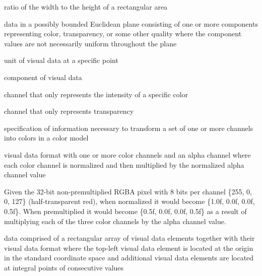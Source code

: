 %
ratio of the width to the height of a rectangular area

%
%
data in a possibly bounded Euclidean plane consisting of one or more components representing color, transparency, or some other quality where the component values are not necessarily uniform throughout the plane

%
unit of visual data at a specific point

%
component of visual data

%
channel that only represents the intensity of a specific color

%
channel that only represents transparency

%
specification of information necessary to transform a set of one or more channels into colors in a color model

%
visual data format with one or more color channels and an alpha channel where each color channel is normalized and then multiplied by the normalized alpha channel value
\begin{example}
Given the 32-bit non-premultiplied RGBA pixel with 8 bits per channel \{255, 0, 0, 127\} (half-transparent red), when normalized it would become \{1.0f, 0.0f, 0.0f, 0.5f\}. When premultiplied it would become \{0.5f, 0.0f, 0.0f, 0.5f\} as a result of multiplying each of the three color channels by the alpha channel value.
\end{example}

%
data comprised of a rectangular array of visual data elements together with their visual data format where the top-left visual data element is located at the origin in the standard coordinate space and additional visual data elements are located at integral points of consecutive values

